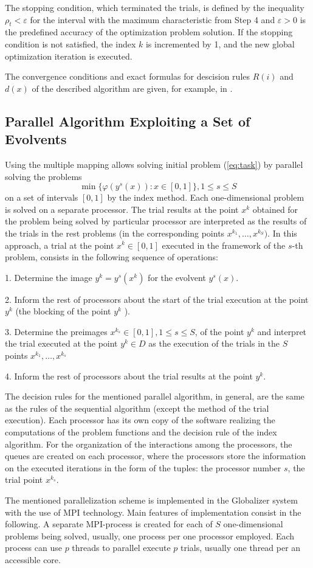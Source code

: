 \documentclass{svproc}
\begin{document}
The stopping condition, which terminated the trials, is defined by the inequality
$\rho_t<\varepsilon$
for the interval with the maximum characteristic from Step 4 and \(\varepsilon >0\) is the
predefined
accuracy of the optimization problem solution. If the stopping condition is not satisfied,
the index \(k\) is incremented by 1, and the new global optimization iteration is executed.

The convergence conditions and exact formulas for descision rules $R(i)$ and $d(x)$ of the
described algorithm are given, for example, in \cite{strSergGO}.

\subsection{Parallel Algorithm Exploiting a Set of Evolvents}
\label{sec:parallel_evolvents}
Using the multiple mapping allows solving initial problem (\ref{eq:task}) by parallel solving the
problems
\[
\min\{\varphi(y^s(x)):x\in [0,1]\}, 1\leqslant s\leqslant S
\]
on a set of intervals $[0,1]$ by the index method. Each one-dimensional problem is solved on a
separate processor. The trial results at the point \(x^k\) obtained for the problem being solved by
particular processor are interpreted as the results of the trials in the rest problems (in the
corresponding points \(x^{k_1},\dots,x^{k_S})\). In this approach, a trial at the point \(x^k \in
[0,1]\) executed in the framework of the \(s\)-th problem, consists in the following sequence of
operations:
\par
1. Determine the image \(y^k=y^s (x^k)\) for the evolvent \(y^s (x)\).
\par
2. Inform the rest of processors about the start of the trial execution at the point \( y^k\) (the
blocking of the point \(y^k\) ).
\par
3. Determine the preimages \(x{}^{k_s}  \in [0,1], 1\leqslant s\leqslant S\), of the point \(y^k\) and interpret the
trial executed at the point \(y^k \in D \) as the execution of the trials in the \(S\) points
\(x{}^{k_1} ,\dots,x{}^{k_s} \)
\par
4. Inform the rest of processors about the trial results at the point \(y^k\).
\par
The decision rules for the mentioned parallel algorithm, in general, are the same as the rules of the
sequential algorithm (except the method of the trial execution). Each processor has its own copy
of the software realizing the computations of the problem functions and the decision rule of the
index algorithm. For the organization of the interactions among the processors, the queues are
created on each processor, where the processors store the information on the executed iterations
in the form of the tuples: the processor number \(s\), the trial point \(x{}^{k_s}\).
\par
The mentioned parallelization scheme is implemented in the Globalizer system with the use of MPI technology. Main
features of implementation consist in the following. A separate MPI-process is created for each
of \(S\) one-dimensional problems being solved, usually, one process per one processor
employed. Each process can use $p$ threads to parallel execute $p$ trials, usually one thread per an accessible core.
\end{document}
